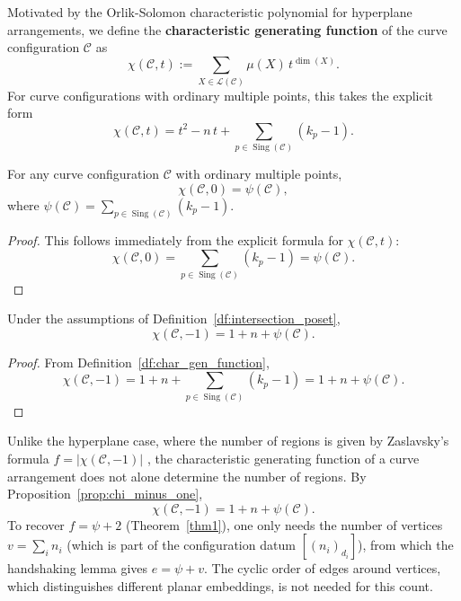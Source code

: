 \documentclass[article,11pt]{amsart} \numberwithin{equation}{section}
\numberwithin{equation}{section}
\begin{document}
{\begin{df}
	\label{df:char_gen_function}
	Motivated by the Orlik-Solomon characteristic polynomial for hyperplane arrangements\cite{OrlikTerao}, we define the \textbf{characteristic
		generating function} of the curve configuration $\mathcal{C}$ as
	\[
	\chi(\mathcal{C}, t)
	:= \sum_{X \in \mathcal{L}(\mathcal{C})} \mu(X)\, t^{\dim(X)}.
	\]
	For curve configurations with ordinary multiple points, this takes the
	explicit form
	\[
	\chi(\mathcal{C}, t)
	= t^2 - n\,t + \sum_{p \in \operatorname{Sing}(\mathcal{C})} (k_p - 1).
	\]
\end{df}

\begin{inp}
	\label{prop:chi_psi_relation}
	For any curve configuration $\mathcal{C}$ with ordinary multiple points,
	\[
	\chi(\mathcal{C}, 0) = \psi(\mathcal{C}),
	\]
	where $\psi(\mathcal{C}) = \sum_{p \in \operatorname{Sing}(\mathcal{C})} (k_p - 1)$.
\end{inp}
\begin{proof}
	This follows immediately from the explicit formula for
	$\chi(\mathcal{C}, t)$:
	\[
	\chi(\mathcal{C}, 0) = \sum_{p \in \operatorname{Sing}(\mathcal{C})} (k_p - 1) = \psi(\mathcal{C}).
	\]
\end{proof}

\begin{inp}
	\label{prop:chi_minus_one}
	Under the assumptions of Definition~\ref{df:intersection_poset},
	\[
	\chi(\mathcal{C}, -1) = 1 + n + \psi(\mathcal{C}).
	\]
\end{inp}
\begin{proof}
	From Definition~\ref{df:char_gen_function},
	\[
	\chi(\mathcal{C}, -1) = 1 + n + \sum_{p \in \operatorname{Sing}(\mathcal{C})} (k_p - 1)
	= 1 + n + \psi(\mathcal{C}).
	\]
\end{proof}

\begin{rk}
	Unlike the hyperplane case, where the number of regions is given by
	Zaslavsky's formula $f = |\chi(\mathcal{C}, -1)|$ \cite{OrlikTerao},
	the characteristic generating function of a curve arrangement does not
	alone determine the number of regions. By
	Proposition~\ref{prop:chi_minus_one},
	\[
	\chi(\mathcal{C}, -1) = 1 + n + \psi(\mathcal{C}).
	\]
	To recover $f = \psi + 2$ (Theorem~\ref{thm1}), one only needs the number of
	vertices $v = \sum_i n_i$ (which is part of the configuration datum
	$[(n_i)_{d_i}]$), from which the handshaking lemma gives
	$e = \psi + v$. The cyclic order of edges around vertices,
	which distinguishes different planar embeddings, is not needed
	for this count.
\end{rk}

}
\end{document}
